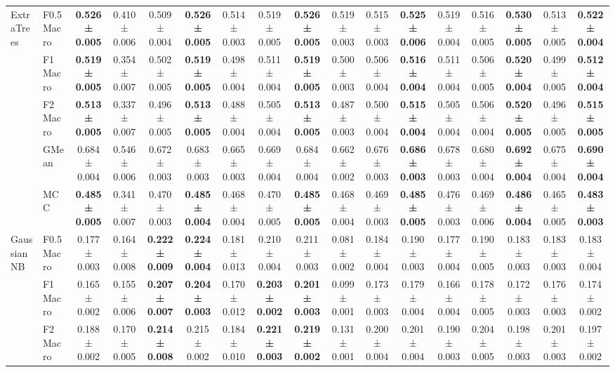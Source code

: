 \begin{table}[H]
{\begin{tabular}{llccccccccccccccc}
\multirow[t]{5}{*}{ExtraTrees} & F0.5 Macro & \textbf{0.526 ± 0.005} & 0.410 ± 0.006 & 0.509 ± 0.004 & \textbf{0.526 ± 0.005} & 0.514 ± 0.003 & 0.519 ± 0.005 & \textbf{0.526 ± 0.005} & 0.519 ± 0.003 & 0.515 ± 0.003 & \textbf{0.525 ± 0.006} & 0.519 ± 0.004 & 0.516 ± 0.005 & \textbf{0.530 ± 0.005} & 0.513 ± 0.005 & \textbf{0.522 ± 0.004} \\
 & F1 Macro & \textbf{0.519 ± 0.005} & 0.354 ± 0.007 & 0.502 ± 0.005 & \textbf{0.519 ± 0.005} & 0.498 ± 0.004 & 0.511 ± 0.004 & \textbf{0.519 ± 0.005} & 0.500 ± 0.003 & 0.506 ± 0.004 & \textbf{0.516 ± 0.004} & 0.511 ± 0.004 & 0.506 ± 0.005 & \textbf{0.520 ± 0.004} & 0.499 ± 0.005 & \textbf{0.512 ± 0.004} \\
 & F2 Macro & \textbf{0.513 ± 0.005} & 0.337 ± 0.007 & 0.496 ± 0.005 & \textbf{0.513 ± 0.005} & 0.488 ± 0.004 & 0.505 ± 0.004 & \textbf{0.513 ± 0.005} & 0.487 ± 0.003 & 0.500 ± 0.004 & \textbf{0.515 ± 0.004} & 0.505 ± 0.004 & 0.506 ± 0.004 & \textbf{0.520 ± 0.005} & 0.496 ± 0.005 & \textbf{0.515 ± 0.005} \\
 & GMean & 0.684 ± 0.004 & 0.546 ± 0.006 & 0.672 ± 0.003 & 0.683 ± 0.003 & 0.665 ± 0.003 & 0.669 ± 0.004 & 0.684 ± 0.004 & 0.662 ± 0.002 & 0.676 ± 0.003 & \textbf{0.686 ± 0.003} & 0.678 ± 0.003 & 0.680 ± 0.004 & \textbf{0.692 ± 0.004} & 0.675 ± 0.004 & \textbf{0.690 ± 0.004} \\
 & MCC & \textbf{0.485 ± 0.005} & 0.341 ± 0.007 & 0.470 ± 0.003 & \textbf{0.485 ± 0.004} & 0.468 ± 0.004 & 0.470 ± 0.005 & \textbf{0.485 ± 0.005} & 0.468 ± 0.004 & 0.469 ± 0.003 & \textbf{0.485 ± 0.005} & 0.476 ± 0.003 & 0.469 ± 0.006 & \textbf{0.486 ± 0.004} & 0.465 ± 0.005 & \textbf{0.483 ± 0.003} \\
\cline{1-17}
\multirow[t]{5}{*}{GaussianNB} & F0.5 Macro & 0.177 ± 0.003 & 0.164 ± 0.008 & \textbf{0.222 ± 0.009} & \textbf{0.224 ± 0.004} & 0.181 ± 0.013 & 0.210 ± 0.004 & 0.211 ± 0.003 & 0.081 ± 0.002 & 0.184 ± 0.004 & 0.190 ± 0.003 & 0.177 ± 0.004 & 0.190 ± 0.005 & 0.183 ± 0.003 & 0.183 ± 0.003 & 0.183 ± 0.004 \\
 & F1 Macro & 0.165 ± 0.002 & 0.155 ± 0.006 & \textbf{0.207 ± 0.007} & \textbf{0.204 ± 0.003} & 0.170 ± 0.012 & \textbf{0.203 ± 0.002} & \textbf{0.201 ± 0.003} & 0.099 ± 0.001 & 0.173 ± 0.003 & 0.179 ± 0.004 & 0.166 ± 0.004 & 0.178 ± 0.005 & 0.172 ± 0.003 & 0.176 ± 0.003 & 0.174 ± 0.002 \\
 & F2 Macro & 0.188 ± 0.002 & 0.170 ± 0.005 & \textbf{0.214 ± 0.008} & 0.215 ± 0.002 & 0.184 ± 0.010 & \textbf{0.221 ± 0.003} & \textbf{0.219 ± 0.002} & 0.131 ± 0.001 & 0.200 ± 0.004 & 0.201 ± 0.004 & 0.190 ± 0.003 & 0.204 ± 0.005 & 0.198 ± 0.003 & 0.201 ± 0.003 & 0.197 ± 0.002 \\

\end{tabular}}
\end{table}

